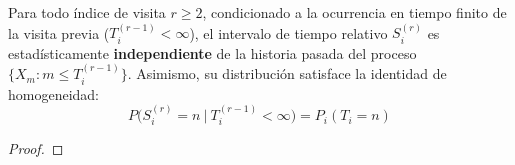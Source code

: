 \begin{lema}
    Para todo índice de visita $r \geq 2$, condicionado a la ocurrencia en tiempo finito de la visita previa ($T_i^{(r-1)} < \infty$), el intervalo de tiempo relativo $S_i^{(r)}$ es estadísticamente \textbf{independiente} de la historia pasada del proceso $\{X_m : m \leq T_i^{(r-1)}\}$. Asimismo, su distribución satisface la identidad de homogeneidad:
    \[
    P\big(S_i^{(r)} = n \ \big| \ T_i^{(r-1)} < \infty\big) = P_i(T_i = n)
    \]

\begin{proof}
\end{proof}
\end{lema}

